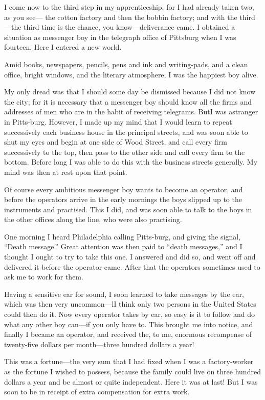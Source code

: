 \documentclass[11pt,openany]{book}
\begin{document}
I come now to the third step in my apprenticeship, for I had already taken two, as you see--- the cotton factory and then the bobbin factory; and with the third---the third time is the chance, you know---deliverance came. I obtained a situation as messenger boy in the telegraph office of Pittsburg when I was fourteen. Here I entered a new world.

Amid books, newspapers, pencils, pens and ink and writing-pads, and a clean office, bright windows, and the literary atmosphere, I was the happiest boy alive.

My only dread was that I should some day be dismissed because I did not know the city; for it is necessary that a messenger boy should know all the firms and addresses of men who are in the habit of receiving telegrams. ButI was astranger in Pitts-burg. However, I made up my mind that I would learn to repeat successively each business house in the principal streets, and was soon able to shut my eyes and begin at one side of Wood Street, and call every firm successively to the top, then pass to the other side and call every firm to the bottom. Before long I was able to do this with the business streets generally. My mind was then at rest upon that point.

Of course every ambitious messenger boy wants to become an operator, and before the operators arrive in the early mornings the boys slipped up to the instruments and practised. This I did, and was soon able to talk to the boys in the other offices along the line, who were also practising.

One morning I heard Philadelphia calling Pitts-burg, and giving the signal, ``Death message.'' Great attention was then paid to ``death messages,'' and I thought I ought to try to take this one. I answered and did so, and went off and delivered it before the operator came. After that the operators sometimes used to ask me to work for them.

Having a sensitive ear for sound, I soon learned to take messages by the ear, which was then very uncommon---lI think only two persons in the United States could then do it. Now every operator takes by ear, so easy is it to follow and do what any other boy can---if you only have to. This brought me into notice, and finally I became an operator, and received the, to me, enormous recompense of twenty-five dollars per month---three hundred dollars a year!

This was a fortune---the very sum that I had fixed when I was a factory-worker as the fortune I wished to possess, because the family could live on three hundred dollars a year and be almost or quite independent. Here it was at last! But I was soon to be in receipt of extra compensation for extra work.
\end{document}
